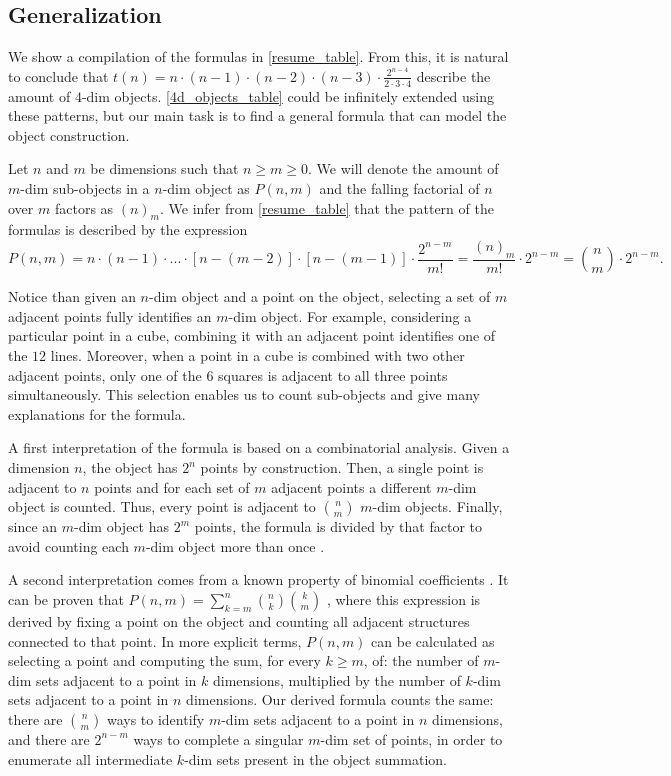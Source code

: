 \documentclass{article}
\begin{document}
	\subsection{Generalization}
	
	We show a compilation of the formulas in \autoref{resume_table}. From this, it is natural to conclude that $t(n) = n\cdot(n-1)\cdot(n-2)\cdot(n-3)\cdot\frac{2^{n-4}}{2 \cdot 3 \cdot 4}$ describe the amount of $4$-dim objects. \autoref{4d_objects_table} could be infinitely extended using these patterns, but our main task is to find a general formula that can model the object construction.
	
	
	Let $n$ and $m$ be dimensions such that $n \geq m \geq 0$. We will denote the amount of $m$-dim sub-objects in a $n$-dim object as $P(n,m)$ and the falling factorial of $n$ over $m$ factors as $(n)_{m}$. We infer from \autoref{resume_table} that the pattern of the formulas is described by the expression \cite{coxeter1973regular}
	$$P(n,m) = n \cdot (n-1)\cdot ... \cdot [n-(m-2)] \cdot [n-(m-1)] \cdot \frac{2^{n-m}}{m!} = \frac{(n)_{m}}{m!} \cdot 2^{n-m} = \binom{n}{m}\cdot2^{n-m} .$$
	
	Notice than given an $n$-dim object and a point on the object, selecting a set of $m$ adjacent points fully identifies an $m$-dim object. For example, considering a particular point in a cube, combining it with an adjacent point identifies one of the $12$ lines. Moreover, when a point in a cube is combined with two other adjacent points, only one of the $6$ squares is adjacent to all three points simultaneously. This selection enables us to count sub-objects and give many explanations for the formula.
	
	A first interpretation of the formula is based on a combinatorial analysis. Given a dimension $n$, the object has $2^{n}$ points by construction. Then, a single point is adjacent to $n$ points and for each set of $m$ adjacent points a different $m$-dim object is counted. Thus, every point is adjacent to $\binom{n}{m}$ $m$-dim objects. Finally, since an $m$-dim object has $2^{m}$ points, the formula is divided by that factor to avoid counting each $m$-dim object more than once \cite{countingHypercubes}.
	
	A second interpretation comes from a known property of binomial coefficients \cite{rice2007}. It can be proven that $P(n,m) = \sum_{k=m}^{n} \binom{n}{k} \binom{k}{m}$ \cite{countingHypercubes}, where this expression is derived by fixing a point on the object and counting all adjacent structures connected to that point. In more explicit terms, $P(n,m)$ can be calculated as selecting a point and computing the sum, for every $k\geq m$, of: the number of $m$-dim sets adjacent to a point in $k$ dimensions, multiplied by the number of $k$-dim sets adjacent to a point in $n$ dimensions. Our derived formula counts the same: there are $\binom{n}{m}$ ways to identify $m$-dim sets adjacent to a point in $n$ dimensions, and there are $2^{n-m}$ ways to complete a singular $m$-dim set of points, in order to enumerate all intermediate $k$-dim sets present in the object summation.
	
\end{document}
